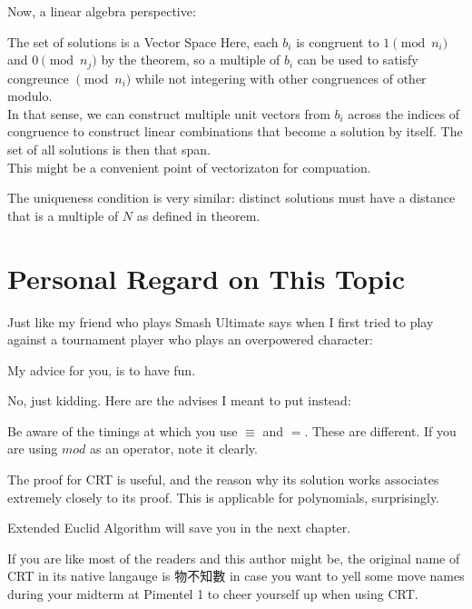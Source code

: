 Now, a linear algebra perspective:
\begin{ln-think}{The set of solutions is a Vector Space}{}
    Here, each $b_i$ is congruent to $1\pmod{n_i}$ and $0\pmod{n_j}$ by the theorem, so a multiple of $b_i$ can be used to satisfy congreunce $\pmod{n_i}$ while not integering with other congruences of other modulo. \\
    In that sense, we can construct multiple unit vectors from $b_i$ across the indices of congruence to construct linear combinations that become a solution by itself. The set of all solutions is then that span. \\
    This might be a convenient point of vectorizaton for compuation.
\end{ln-think}
The uniqueness condition is very similar: distinct solutions must have a distance that is a multiple of $N$ as defined in theorem.

\section{Personal Regard on This Topic}
Just like my friend who plays Smash Ultimate says when I first tried to play against a tournament player who plays an overpowered character:
\begin{center}
    My advice for you, is to have fun.
\end{center}

No, just kidding. Here are the advises I meant to put instead:
\begin{bindenum}
    \item Be aware of the timings at which you use $\equiv$ and $=$. These are different. If you are using $mod$ as an operator, note it clearly.
    \item The proof for CRT is useful, and the reason why its solution works associates extremely closely to its proof. This is applicable for polynomials, surprisingly.
    \item Extended Euclid Algorithm will save you in the next chapter.
    \item If you are like most of the readers and this author might be, the original name of CRT in its native langauge is 物不知數 in case you want to yell some move names during your midterm at Pimentel 1 to cheer yourself up when using CRT.
\end{bindenum}
